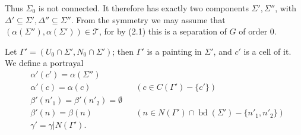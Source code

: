 Thus $\Sigma_0$ is not connected. It therefore has exactly two components $\Sigma', \Sigma''$, with $\Delta' \subseteq \Sigma', \Delta'' \subseteq \Sigma''$. From the symmetry we may assume that $(\alpha(\Sigma''), \alpha(\Sigma')) \in \mathscr{T}$, for by (2.1) this is a separation of $G$ of order 0.

Let $\Gamma' = (U_0 \cap \Sigma', N_0 \cap \Sigma')$; then $\Gamma'$ is a painting in $\Sigma'$, and $c'$ is a cell of it. We define a portrayal
\begin{align*}
&\alpha'(c') = \alpha(\Sigma'') \\
&\alpha'(c) = \alpha(c) &&(c \in C(\Gamma') - \{c'\}) \\
&\beta'(n'_1) = \beta'(n'_2) = \emptyset \\
&\beta'(n) = \beta(n) &&(n \in N(\Gamma') \cap \operatorname{bd}(\Sigma') - \{n'_1, n'_2\}) \\
&\gamma' = \gamma | N(\Gamma').
\end{align*}
